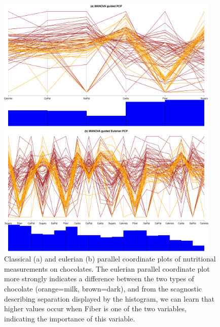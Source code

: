 \documentclass[11pt]{article}
\begin{document}
\begin{itemize}
\begin{figure}[p]
\centerline{\includegraphics[width=0.95\textwidth]{images/pcp-choc-classic.pdf}}
\centerline{\includegraphics[width=0.95\textwidth]{images/pcp-choc-eulerian.pdf}}
\caption{Classical (a) and eulerian (b) parallel coordinate plots of nutritional measurements on chocolates. The eulerian parallel coordinate plot more strongly indicates a difference between the two types of chocolate (orange=milk, brown=dark), and from the scagnostic describing separation displayed by the histogram, we can learn that higher values occur when Fiber is one of the two variables, indicating the importance of this variable.}
\label{eulerian}
\end{figure}


\end{itemize}
\end{document}

